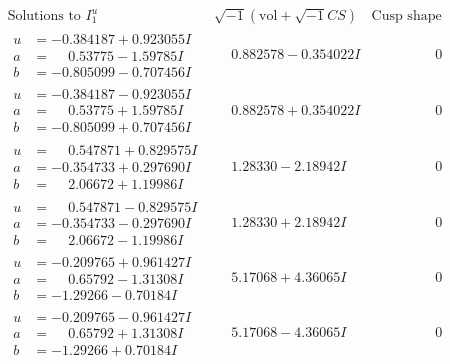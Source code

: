 \documentclass[1p]{elsarticle_modified}
\theoremstyle{definition}
\newcommand{\I}{\sqrt{-1}}
\begin{document}
$$\begin{array}{c|c|c}  
\text{Solutions to }I^u_{1}& \I (\text{vol} + \sqrt{-1}CS) & \text{Cusp shape}\\
 \hline 
\begin{aligned}
u &= -0.384187 + 0.923055 I \\
a &= \phantom{-}0.53775 - 1.59785 I \\
b &= -0.805099 - 0.707456 I\end{aligned}
 & \phantom{-}0.882578 - 0.354022 I & \phantom{-0.000000 } 0 \\ \hline\begin{aligned}
u &= -0.384187 - 0.923055 I \\
a &= \phantom{-}0.53775 + 1.59785 I \\
b &= -0.805099 + 0.707456 I\end{aligned}
 & \phantom{-}0.882578 + 0.354022 I & \phantom{-0.000000 } 0 \\ \hline\begin{aligned}
u &= \phantom{-}0.547871 + 0.829575 I \\
a &= -0.354733 + 0.297690 I \\
b &= \phantom{-}2.06672 + 1.19986 I\end{aligned}
 & \phantom{-}1.28330 - 2.18942 I & \phantom{-0.000000 } 0 \\ \hline\begin{aligned}
u &= \phantom{-}0.547871 - 0.829575 I \\
a &= -0.354733 - 0.297690 I \\
b &= \phantom{-}2.06672 - 1.19986 I\end{aligned}
 & \phantom{-}1.28330 + 2.18942 I & \phantom{-0.000000 } 0 \\ \hline\begin{aligned}
u &= -0.209765 + 0.961427 I \\
a &= \phantom{-}0.65792 - 1.31308 I \\
b &= -1.29266 - 0.70184 I\end{aligned}
 & \phantom{-}5.17068 + 4.36065 I & \phantom{-0.000000 } 0 \\ \hline\begin{aligned}
u &= -0.209765 - 0.961427 I \\
a &= \phantom{-}0.65792 + 1.31308 I \\
b &= -1.29266 + 0.70184 I\end{aligned}
 & \phantom{-}5.17068 - 4.36065 I & \phantom{-0.000000 } 0 \\ \hline\begin{aligned}

\end{aligned}
\end{array}$$
\end{document}
